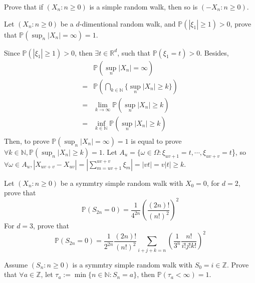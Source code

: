 \documentclass{ctexart}
\newif\ifpreface
\begin{document}
\large
\setlength{\baselineskip}{1.2em}
\ifpreface
  
\else
  \maketitle
\fi
{}

\begin{problem}\label{pro:1}
  Prove that if \((X_n:n \geq 0)\) is a simple random walk, then so is \((-X_n:n \geq 0)\).
\end{problem}

\begin{problem}\label{pro:2}
  Let \((X_n:n \geq 0)\) be a \(d\)-dimentional random walk, and \(\mathbb{P}(|\xi_1| \geq 1)>0\),
  prove that \(\mathbb{P}(\sup_{n}|X_n|=\infty)=1\).
\end{problem}
\begin{solution}
  Since \(\mathbb{P}(|\xi_1| \geq 1)>0\), then \(\exists t \in \mathbb{R}^d\), such that \(\mathbb{P}(\xi_1=t) > 0\).
  Besides,
  \begin{equation}
    \begin{aligned}
        & \mathbb{P}(\sup_{n} |X_n|= \infty)                             \\
      = & \mathbb{P}(\bigcap_{k \in \mathbb{N}}\{\sup_n |X_n| \geq k\} ) \\
      = & \lim_{k \to \infty}\mathbb{P}(\sup_n |X_n| \geq k)             \\
      = & \inf_{k \in \mathbb{N}} \mathbb{P}(\sup_n |X_n| \geq k)        \\

    \end{aligned}
  \end{equation}
  Then, to prove \(\mathbb{P}(\sup_n |X_n| = \infty) = 1\) is equal to prove
  \(\forall k \in \mathbb{N}, \mathbb{P}(\sup_n |X_n| \geq k) =1\).
  Let \(A_u = \{\omega \in \Omega: \xi_{uv+1}=t,\cdots,\xi_{uv+v}=t\)\},
  so \(\forall \omega \in A_u, |X_{uv+v}-X_{uv}|=|\sum_{m = uv+1}^{uv+v}\xi_m|=|vt|=v |t| \geq k\).

\end{solution}

\begin{problem}\label{pro:3}
  Let \((X_n:n \geq 0)\) be a symmtry simple random walk with \(X_0=0\), for \(d=2\), prove that
  \[
    \mathbb{P}(S_{2n}=0)=\frac{1}{4^{2n}}\left(\frac{(2n)!}{(n!)^2}\right)^2
  \]
  For \(d=3\), prove that
  \[
    \mathbb{P}(S_{2n}=0)=\frac{1}{2^{2n}}\frac{(2n)!}{(n!)^2}\sum_{i + j + k = n} \left(\frac{1}{3^n}\frac{n!}{i!j!k!}\right)^2
  \]
\end{problem}

\begin{problem}\label{pro:4}
  Assume \((S_n:n \geq 0)\) is a symmtry simple random walk with \(S_0 = i \in \mathbb{Z}\).
  Prove that \(\forall a \in \mathbb{Z}\), let \(\tau_a:=\min\{n \in \mathbb{N}:S_n=a \}\), then \(\mathbb{P}(\tau_a < \infty) = 1 \).
\end{problem}
\end{document}

